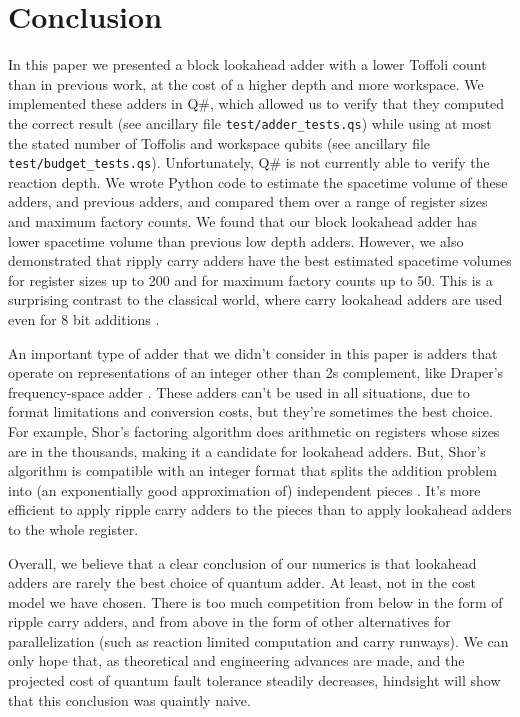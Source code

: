 \documentclass[onecolumn,unpublished]{quantumarticle}
\theoremstyle{definition}
\theoremstyle{definition}
\theoremstyle{definition}
\begin{document}
\section{Conclusion}
\label{sec:conclusion}

In this paper we presented a block lookahead adder with a lower Toffoli count than in previous work, at the cost of a higher depth and more workspace.
We implemented these adders in Q\#, which allowed us to verify that they computed the correct result (see ancillary file \texttt{test/adder\_tests.qs}) while using at most the stated number of Toffolis and workspace qubits (see ancillary file \\\texttt{test/budget\_tests.qs}).
Unfortunately, Q\# is not currently able to verify the reaction depth.
We wrote Python code to estimate the spacetime volume of these adders, and previous adders, and compared them over a range of register sizes and maximum factory counts.
We found that our block lookahead adder has lower spacetime volume than previous low depth adders.
However, we also demonstrated that ripply carry adders have the best estimated spacetime volumes for register sizes up to 200 and for maximum factory counts up to 50.
This is a surprising contrast to the classical world, where carry lookahead adders are used even for 8 bit additions \cite{shirriff2020reverseengineer8008}.

An important type of adder that we didn't consider in this paper is adders that operate on representations of an integer other than 2s complement, like Draper's frequency-space adder \cite{draper2000qftaddition}.
These adders can't be used in all situations, due to format limitations and conversion costs, but they're sometimes the best choice.
For example, Shor's factoring algorithm \cite{shor1994algorithms} does arithmetic on registers whose sizes are in the thousands, making it a candidate for lookahead adders.
But, Shor's algorithm is compatible with an integer format that splits the addition problem into (an exponentially good approximation of) independent pieces \cite{gidney2019approximate,gidney2019factor}.
It's more efficient to apply ripple carry adders to the pieces than to apply lookahead adders to the whole register.

Overall, we believe that a clear conclusion of our numerics is that lookahead adders are rarely the best choice of quantum adder.
At least, not in the cost model we have chosen.
There is too much competition from below in the form of ripple carry adders, and from above in the form of other alternatives for parallelization (such as reaction limited computation and carry runways).
We can only hope that, as theoretical and engineering advances are made, and the projected cost of quantum fault tolerance steadily decreases, hindsight will show that this conclusion was quaintly naive.
\end{document}
